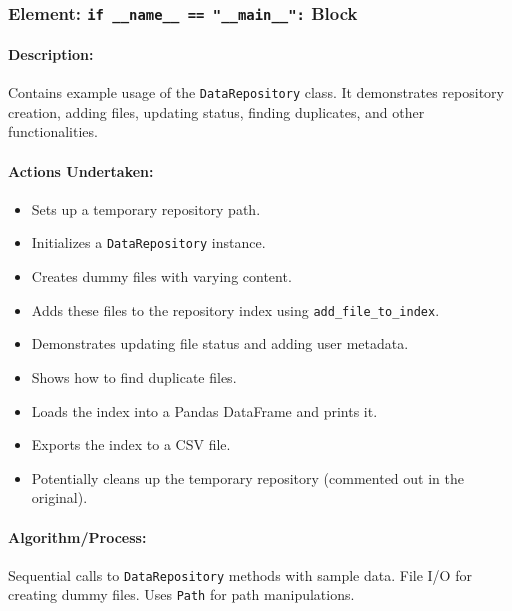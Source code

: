 \documentclass{article}
\begin{document}
\subsubsection{Element: \texttt{if \_\_name\_\_ == "\_\_main\_\_":} Block}
\paragraph{Description:} Contains example usage of the \texttt{DataRepository} class. It demonstrates repository creation, adding files, updating status, finding duplicates, and other functionalities.
\paragraph{Actions Undertaken:}
\begin{itemize}
    \item Sets up a temporary repository path.
    \item Initializes a \texttt{DataRepository} instance.
    \item Creates dummy files with varying content.
    \item Adds these files to the repository index using \texttt{add\_file\_to\_index}.
    \item Demonstrates updating file status and adding user metadata.
    \item Shows how to find duplicate files.
    \item Loads the index into a Pandas DataFrame and prints it.
    \item Exports the index to a CSV file.
    \item Potentially cleans up the temporary repository (commented out in the original).
\end{itemize}
\paragraph{Algorithm/Process:}
Sequential calls to \texttt{DataRepository} methods with sample data. File I/O for creating dummy files. Uses \texttt{Path} for path manipulations.
\end{document}
